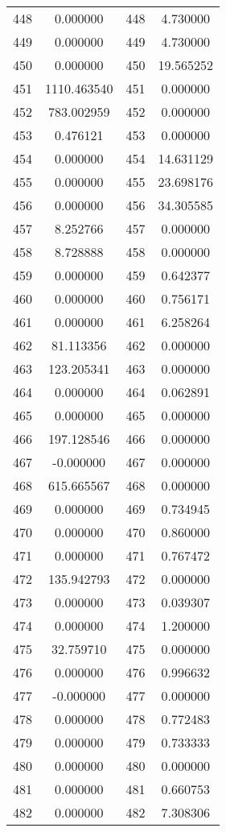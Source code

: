 \documentclass[12pt]{article}
\begin{document}
\begin{longtable}{@{}cccc@{}}
448 & 0.000000 & 448 & 4.730000 \\
449 & 0.000000 & 449 & 4.730000 \\
450 & 0.000000 & 450 & 19.565252 \\
451 & 1110.463540 & 451 & 0.000000 \\
452 & 783.002959 & 452 & 0.000000 \\
453 & 0.476121 & 453 & 0.000000 \\
454 & 0.000000 & 454 & 14.631129 \\
455 & 0.000000 & 455 & 23.698176 \\
456 & 0.000000 & 456 & 34.305585 \\
457 & 8.252766 & 457 & 0.000000 \\
458 & 8.728888 & 458 & 0.000000 \\
459 & 0.000000 & 459 & 0.642377 \\
460 & 0.000000 & 460 & 0.756171 \\
461 & 0.000000 & 461 & 6.258264 \\
462 & 81.113356 & 462 & 0.000000 \\
463 & 123.205341 & 463 & 0.000000 \\
464 & 0.000000 & 464 & 0.062891 \\
465 & 0.000000 & 465 & 0.000000 \\
466 & 197.128546 & 466 & 0.000000 \\
467 & -0.000000 & 467 & 0.000000 \\
468 & 615.665567 & 468 & 0.000000 \\
469 & 0.000000 & 469 & 0.734945 \\
470 & 0.000000 & 470 & 0.860000 \\
471 & 0.000000 & 471 & 0.767472 \\
472 & 135.942793 & 472 & 0.000000 \\
473 & 0.000000 & 473 & 0.039307 \\
474 & 0.000000 & 474 & 1.200000 \\
475 & 32.759710 & 475 & 0.000000 \\
476 & 0.000000 & 476 & 0.996632 \\
477 & -0.000000 & 477 & 0.000000 \\
478 & 0.000000 & 478 & 0.772483 \\
479 & 0.000000 & 479 & 0.733333 \\
480 & 0.000000 & 480 & 0.000000 \\
481 & 0.000000 & 481 & 0.660753 \\
482 & 0.000000 & 482 & 7.308306 \\

\end{longtable}
\end{document}
